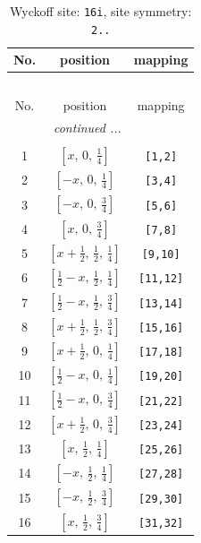 \documentclass[fleqn,8pt]{jsarticle}
\begin{document}
\begin{longtable}{ccc}
\caption{Wyckoff site: {\tt 16i}, site symmetry: {\tt 2..}}
 \\
 \hline \hline
No. & position & mapping \\ \hline \endfirsthead

\multicolumn{2}{l}{\tablename\ \thetable{}} \\
 \hline \hline
No. & position & mapping \\ \hline \endhead

 \hline \hline
\multicolumn{2}{r}{\footnotesize\it continued ...} \\ \endfoot

 \hline \hline
\multicolumn{2}{r}{} \\ \endlastfoot

1 & $\left[ x,\, 0,\, \frac{1}{4} \right]$ & {\tt [1,2]} \\ \hline
2 & $\left[ - x,\, 0,\, \frac{1}{4} \right]$ & {\tt [3,4]} \\ \hline
3 & $\left[ - x,\, 0,\, \frac{3}{4} \right]$ & {\tt [5,6]} \\ \hline
4 & $\left[ x,\, 0,\, \frac{3}{4} \right]$ & {\tt [7,8]} \\ \hline
5 & $\left[ x + \frac{1}{2},\, \frac{1}{2},\, \frac{1}{4} \right]$ & {\tt [9,10]} \\ \hline
6 & $\left[ \frac{1}{2} - x,\, \frac{1}{2},\, \frac{1}{4} \right]$ & {\tt [11,12]} \\ \hline
7 & $\left[ \frac{1}{2} - x,\, \frac{1}{2},\, \frac{3}{4} \right]$ & {\tt [13,14]} \\ \hline
8 & $\left[ x + \frac{1}{2},\, \frac{1}{2},\, \frac{3}{4} \right]$ & {\tt [15,16]} \\ \hline
9 & $\left[ x + \frac{1}{2},\, 0,\, \frac{1}{4} \right]$ & {\tt [17,18]} \\ \hline
10 & $\left[ \frac{1}{2} - x,\, 0,\, \frac{1}{4} \right]$ & {\tt [19,20]} \\ \hline
11 & $\left[ \frac{1}{2} - x,\, 0,\, \frac{3}{4} \right]$ & {\tt [21,22]} \\ \hline
12 & $\left[ x + \frac{1}{2},\, 0,\, \frac{3}{4} \right]$ & {\tt [23,24]} \\ \hline
13 & $\left[ x,\, \frac{1}{2},\, \frac{1}{4} \right]$ & {\tt [25,26]} \\ \hline
14 & $\left[ - x,\, \frac{1}{2},\, \frac{1}{4} \right]$ & {\tt [27,28]} \\ \hline
15 & $\left[ - x,\, \frac{1}{2},\, \frac{3}{4} \right]$ & {\tt [29,30]} \\ \hline
16 & $\left[ x,\, \frac{1}{2},\, \frac{3}{4} \right]$ & {\tt [31,32]} \\
\end{longtable}
\end{document}
